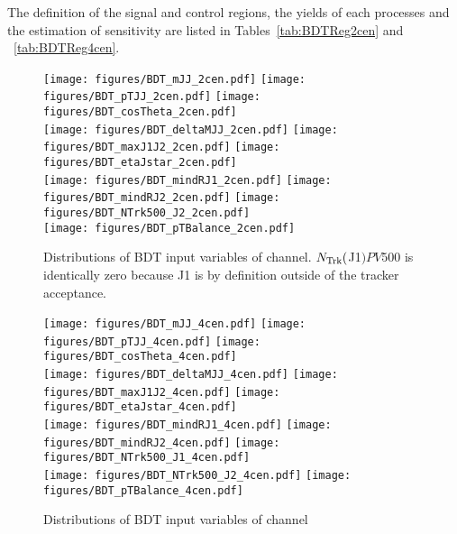 The definition of the signal and control regions, the yields of each processes and the estimation of sensitivity are listed in Tables~\ref{tab:BDTReg2cen} and ~\ref{tab:BDTReg4cen}. 
 
\begin{figure}[htbp]
  \centering
 \texttt{[image: figures/BDT\_mJJ\_2cen.pdf]}
 \texttt{[image: figures/BDT\_pTJJ\_2cen.pdf]}
 \texttt{[image: figures/BDT\_cosTheta\_2cen.pdf]}\\
 \texttt{[image: figures/BDT\_deltaMJJ\_2cen.pdf]}
 \texttt{[image: figures/BDT\_maxJ1J2\_2cen.pdf]}
 \texttt{[image: figures/BDT\_etaJstar\_2cen.pdf]}\\
 \texttt{[image: figures/BDT\_mindRJ1\_2cen.pdf]}
 \texttt{[image: figures/BDT\_mindRJ2\_2cen.pdf]}
 \texttt{[image: figures/BDT\_NTrk500\_J2\_2cen.pdf]}\\
 \texttt{[image: figures/BDT\_pTBalance\_2cen.pdf]}\\

\caption{Distributions of BDT input variables of \twocentral channel.  $N_{\rm Trk}($J1$)PV500$ is identically zero because J1 is by definition outside of the tracker acceptance.}
  \label{fig:BDTInputs2cen}
\end{figure}

\begin{figure}[htbp]
  \centering
 \texttt{[image: figures/BDT\_mJJ\_4cen.pdf]}
 \texttt{[image: figures/BDT\_pTJJ\_4cen.pdf]}
 \texttt{[image: figures/BDT\_cosTheta\_4cen.pdf]}\\
 \texttt{[image: figures/BDT\_deltaMJJ\_4cen.pdf]}
 \texttt{[image: figures/BDT\_maxJ1J2\_4cen.pdf]}
 \texttt{[image: figures/BDT\_etaJstar\_4cen.pdf]}\\
 \texttt{[image: figures/BDT\_mindRJ1\_4cen.pdf]}
 \texttt{[image: figures/BDT\_mindRJ2\_4cen.pdf]}
 \texttt{[image: figures/BDT\_NTrk500\_J1\_4cen.pdf]}\\
 \texttt{[image: figures/BDT\_NTrk500\_J2\_4cen.pdf]}
 \texttt{[image: figures/BDT\_pTBalance\_4cen.pdf]}\\

\caption{Distributions of BDT input variables of \fourcentral channel}
  \label{fig:BDTInputs4cen}
\end{figure}



